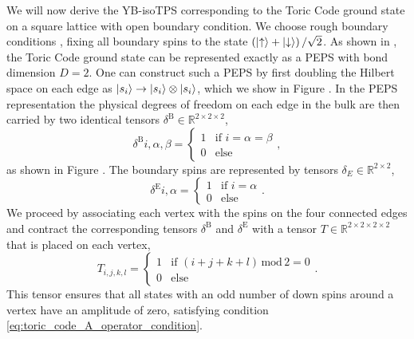 We will now derive the YB-isoTPS corresponding to the Toric Code ground state on a square lattice with open boundary condition. We choose rough boundary conditions \cite{cite:models_for_gapped_boundaries_and_domain_walls}, fixing all boundary spins to the state $\left(\ket{\uparrow} + \ket{\downarrow}\right)/\sqrt{2}$. As shown in \cite{cite:isometric_tensor_network_representation_of_string_net_liquids}, the Toric Code ground state can be represented exactly as a PEPS with bond dimension $D = 2$. One can construct such a PEPS by first doubling the Hilbert space on each edge as $\ket{s_i} \rightarrow \ket{s_i}\otimes\ket{s_i}$, which we show in Figure . In the PEPS representation the physical degrees of freedom on each edge in the bulk are then carried by two identical tensors $\delta^\text{B}\in\mathbb{R}^{2\times2\times2}$,
\begin{equation}
	\delta^\text{B}{i,\alpha,\beta} = \begin{cases}
		1 &\text{if }i=\alpha=\beta\\
		0 &\text{else}
	\end{cases},
\end{equation}
as shown in Figure . The boundary spins are represented by tensors $\delta_E\in\mathbb{R}^{2\times2}$,
\begin{equation}
	\delta^\text{E}{i,\alpha} = \begin{cases}
		1 &\text{if }i=\alpha\\
		0 &\text{else}
	\end{cases}.
\end{equation}
We proceed by associating each vertex with the spins on the four connected edges and contract the corresponding tensors $\delta^\text{B}$ and $\delta^\text{E}$ with a tensor $T\in\mathbb{R}^{2\times2\times2\times2}$ that is placed on each vertex,
\begin{equation}
	T_{i,j,k,l} = \begin{cases}
		1 & \text{if } (i+j+k+l)\,\text{mod}\,2 = 0 \\
		0 & \text{else}
	\end{cases}.
\end{equation}
This tensor ensures that all states with an odd number of down spins around a vertex have an amplitude of zero, satisfying condition \eqref{eq:toric_code_A_operator_condition}. \par
